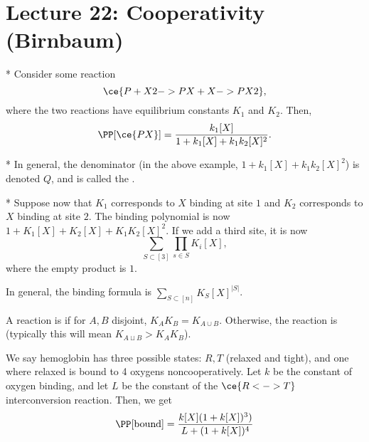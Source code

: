 \section*{Lecture 22: Cooperativity (Birnbaum)}
\setcounter{section}{22}

\begin{exm}*
	Consider some reaction \[
		\ce{ P + X2 -> PX + X -> PX2},
	\]
	where the two reactions have equilibrium constants $K_1$ and $K_2$. Then, \[
		\PP[\ce{PX}] = \frac{k_1[X]}{1 + k_1[X] + k_1k_2[X]^2}.
	\]
\end{exm}

\begin{defn}*
	In general, the denominator (in the above example, $1 + k_1[X] + k_1k_2[X]^2$) is denoted $Q$, and is called the .
\end{defn}

\begin{exm}*
	Suppose now that $K_1$ corresponds to $X$ binding at site $1$ and $K_2$ corresponds to $X$ binding at site $2$. 
	The binding polynomial is now $1 + K_1[X] + K_2[X] + K_1K_2[X]^2$.
	If we add a third site, it is now \[
		\sum_{S\subset [3]} \prod_{s\in S} K_i [X],
	\]
	where the empty product is $1$.
\end{exm}

\begin{fact}
	In general, the binding formula is $\sum_{S\subset [n]} K_S [X]^{|S|}$.
\end{fact}

\begin{defn}
	A reaction is  if for $A,B$ disjoint, $K_A K_B = K_{A\cup B}$.
	Otherwise, the reaction is  (typically this will mean $K_{A\sqcup B} > K_AK_B$).
\end{defn}

\begin{exm}
	We say hemoglobin has three possible states: $R,T$ (relaxed and tight), and one where relaxed is bound to 4 oxygens noncooperatively.
	Let $k$ be the constant of oxygen binding, and let $L$ be the constant of the $\ce{R <-> T}$ interconversion reaction.
	Then, we get \[
		\PP[\text{bound}] = \frac{k[X] (1 + k[X])^3)}{L + (1+ k[X])^4}
	\]
\end{exm}
